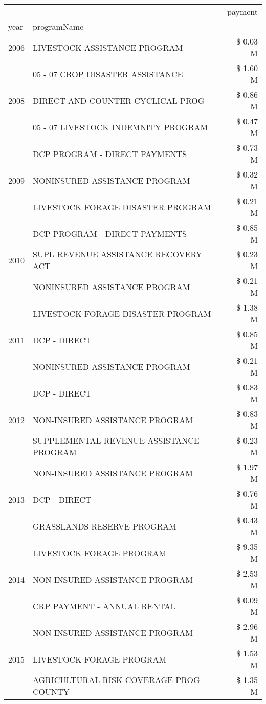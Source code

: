 \begin{tabular}{llr}
\toprule
 &  & payment \\
year & programName &  \\
\midrule
2006 & LIVESTOCK ASSISTANCE PROGRAM & \$ 0.03 M \\
\cline{1-3}
\multirow[t]{3}{*}{2008} & 05 - 07 CROP DISASTER ASSISTANCE & \$ 1.60 M \\
 & DIRECT AND COUNTER CYCLICAL PROG & \$ 0.86 M \\
 & 05 - 07 LIVESTOCK INDEMNITY PROGRAM & \$ 0.47 M \\
\cline{1-3}
\multirow[t]{3}{*}{2009} & DCP PROGRAM - DIRECT PAYMENTS & \$ 0.73 M \\
 & NONINSURED ASSISTANCE PROGRAM & \$ 0.32 M \\
 & LIVESTOCK FORAGE DISASTER  PROGRAM & \$ 0.21 M \\
\cline{1-3}
\multirow[t]{3}{*}{2010} & DCP PROGRAM - DIRECT PAYMENTS & \$ 0.85 M \\
 & SUPL REVENUE ASSISTANCE RECOVERY ACT & \$ 0.23 M \\
 & NONINSURED ASSISTANCE PROGRAM & \$ 0.21 M \\
\cline{1-3}
\multirow[t]{3}{*}{2011} & LIVESTOCK FORAGE DISASTER PROGRAM & \$ 1.38 M \\
 & DCP - DIRECT & \$ 0.85 M \\
 & NONINSURED ASSISTANCE PROGRAM & \$ 0.21 M \\
\cline{1-3}
\multirow[t]{3}{*}{2012} & DCP - DIRECT & \$ 0.83 M \\
 & NON-INSURED ASSISTANCE PROGRAM & \$ 0.83 M \\
 & SUPPLEMENTAL REVENUE ASSISTANCE PROGRAM & \$ 0.23 M \\
\cline{1-3}
\multirow[t]{3}{*}{2013} & NON-INSURED ASSISTANCE PROGRAM & \$ 1.97 M \\
 & DCP - DIRECT & \$ 0.76 M \\
 & GRASSLANDS RESERVE PROGRAM & \$ 0.43 M \\
\cline{1-3}
\multirow[t]{3}{*}{2014} & LIVESTOCK FORAGE PROGRAM & \$ 9.35 M \\
 & NON-INSURED ASSISTANCE PROGRAM & \$ 2.53 M \\
 & CRP PAYMENT - ANNUAL RENTAL & \$ 0.09 M \\
\cline{1-3}
\multirow[t]{3}{*}{2015} & NON-INSURED ASSISTANCE PROGRAM & \$ 2.96 M \\
 & LIVESTOCK FORAGE PROGRAM & \$ 1.53 M \\
 & AGRICULTURAL RISK COVERAGE PROG - COUNTY & \$ 1.35 M \\

\end{tabular}

